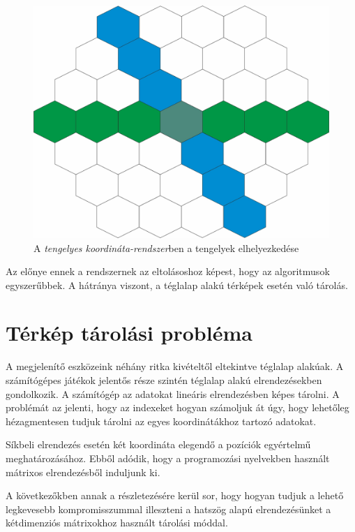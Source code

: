 \begin{figure}[h!]
\centering
\includegraphics[scale=0.2]{kepek/AxialCoord.jpg}
\caption{A \textit{tengelyes koordináta-rendszer}ben a tengelyek elhelyezkedése}
\label{fig:AxialCoord}
\end{figure}

Az előnye ennek a rendszernek az eltolásoshoz képest, hogy az algoritmusok egyszerűbbek. A hátránya viszont, a téglalap alakú térképek esetén való tárolás. 

\section{Térkép tárolási probléma}

A megjelenítő eszközeink néhány ritka kivételtől eltekintve téglalap alakúak. A számítógépes játékok jelentős része szintén téglalap alakú elrendezésekben gondolkozik. A számítógép az adatokat lineáris elrendezésben képes tárolni. A problémát az jelenti, hogy az indexeket hogyan számoljuk át úgy, hogy lehetőleg hézagmentesen tudjuk tárolni az egyes koordinátákhoz tartozó adatokat.

Síkbeli elrendezés esetén két koordináta elegendő a pozíciók egyértelmű meghatározásához. Ebből adódik, hogy a programozási nyelvekben használt mátrixos elrendezésből induljunk ki.

A következőkben annak a részletezésére kerül sor, hogy hogyan tudjuk a lehető legkevesebb kompromisszummal illeszteni a hatszög alapú elrendezésünket a kétdimenziós mátrixokhoz használt tárolási móddal.

